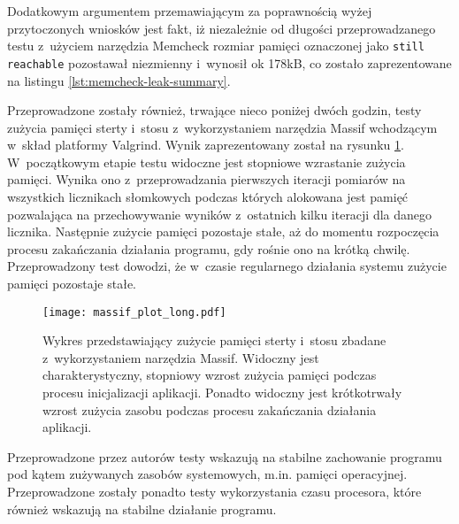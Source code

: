 Dodatkowym argumentem przemawiającym za poprawnością wyżej przytoczonych wniosków jest fakt, iż niezależnie od długości przeprowadzanego testu z~użyciem narzędzia Memcheck rozmiar pamięci oznaczonej jako \lstinline{still reachable} pozostawał niezmienny i~wynosił ok 178kB, co zostało zaprezentowane na listingu \ref{lst:memcheck-leak-summary}.



Przeprowadzone zostały również, trwające nieco poniżej dwóch godzin, testy zużycia pamięci sterty i~stosu z~wykorzystaniem narzędzia Massif wchodzącym w~skład platformy Valgrind. Wynik zaprezentowany został na rysunku \ref{fig:massif-long}. W~początkowym etapie testu widoczne jest stopniowe wzrastanie zużycia pamięci. Wynika ono z~przeprowadzania pierwszych iteracji pomiarów na wszystkich licznikach słomkowych podczas których alokowana jest pamięć pozwalająca na przechowywanie wyników z~ostatnich kilku iteracji dla danego licznika. Następnie zużycie pamięci pozostaje stałe, aż do momentu rozpoczęcia procesu zakańczania działania programu, gdy rośnie ono na krótką chwilę. Przeprowadzony test dowodzi, że w~czasie regularnego działania systemu zużycie pamięci pozostaje stałe.

\begin{figure}[H]
    \centering
    \texttt{[image: massif\_plot\_long.pdf]}
    \caption{Wykres przedstawiający zużycie pamięci sterty i~stosu zbadane z~wykorzystaniem narzędzia Massif. Widoczny jest charakterystyczny, stopniowy wzrost zużycia pamięci podczas procesu inicjalizacji aplikacji. Ponadto widoczny jest krótkotrwały wzrost zużycia zasobu podczas procesu zakańczania działania aplikacji.}
    \label{fig:massif-long}
\end{figure}

Przeprowadzone przez autorów testy wskazują na stabilne zachowanie programu pod kątem zużywanych zasobów systemowych, m.in. pamięci operacyjnej. Przeprowadzone zostały ponadto testy wykorzystania czasu procesora, które również wskazują na stabilne działanie programu.
